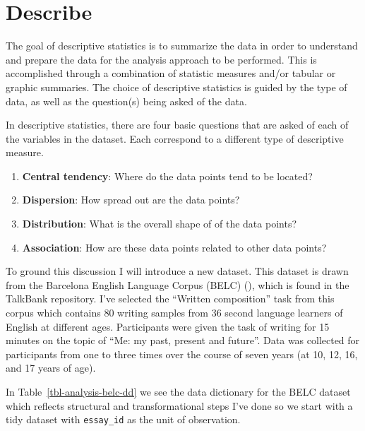 \documentclass[
  letterpaper,
  krantz1]{latex/krantz-mod}
\providecommand{\tightlist}{%
  \setlength{\itemsep}{0pt}\setlength{\parskip}{0pt}}\usepackage{longtable,booktabs,array}
\theoremstyle{definition}
\theoremstyle{definition}
\theoremstyle{remark}
\begin{document}
\section{Describe}\label{sec-analysis-describe}

The goal of descriptive statistics is to
summarize the data in order to understand and prepare the data for the
analysis approach to be performed. This is accomplished through a
combination of statistic measures and/or tabular or graphic summaries.
The choice of descriptive statistics is guided by the type of data, as
well as the question(s) being asked of the data.

In descriptive statistics, there are four basic questions that are asked
of each of the variables in the dataset. Each correspond to a different
type of descriptive measure.

\begin{enumerate}
\def\labelenumi{\arabic{enumi}.}
\tightlist
\item
  \textbf{Central tendency}: Where do the data points tend to be
  located?
\item
  \textbf{Dispersion}: How spread out are the data points?
\item
  \textbf{Distribution}: What is the overall shape of of the data
  points?
\item
  \textbf{Association}: How are these data points related to other data
  points?
\end{enumerate}

To ground this discussion I will introduce a new dataset. This dataset
is drawn from the Barcelona English Language Corpus (BELC)
(), which is found
in the TalkBank repository. I've selected the ``Written composition''
task from this corpus which contains 80 writing samples from 36 second
language learners of English at different ages. Participants were given
the task of writing for 15 minutes on the topic of ``Me: my past,
present and future''. Data was collected for participants from one to
three times over the course of seven years (at 10, 12, 16, and 17 years
of age).

In Table~\ref{tbl-analysis-belc-dd} we see the data
dictionary for the BELC dataset which reflects
structural and transformational steps I've done so we start with a tidy
dataset with \texttt{essay\_id} as the unit of
observation.
\end{document}
